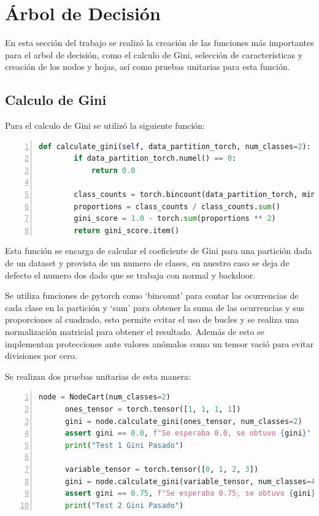 \documentclass[12pt,a4paper]{article}
\begin{document}
\section{Árbol de Decisión}\label{sec:arbol-de-decision}

En esta sección del trabajo se realizó la creación de las funciones más importantes para el arbol de decisión, como el calculo de Gini,
selección de características y creación de los nodos y hojas, así como pruebas unitarias para esta función.

\subsection{Calculo de Gini}\label{subsec:calculo-de-gini}

Para el calculo de Gini se utilizó la siguiente función:

    \begin{lstlisting}[language=Python, numbers=left,label={lst:lstlisting}, basicstyle=\ttfamily\tiny]
      def calculate_gini(self, data_partition_torch, num_classes=2):
        if data_partition_torch.numel() == 0:
            return 0.0

        class_counts = torch.bincount(data_partition_torch, minlength=num_classes).float()
        proportions = class_counts / class_counts.sum()
        gini_score = 1.0 - torch.sum(proportions ** 2)
        return gini_score.item()
    \end{lstlisting}

Esta función se encarga de calcular el coeficiente de Gini para una partición dada de un dataset y provista de un
numero de clases, en nuestro caso se deja de defecto el numero dos dado que se trabaja con normal y backdoor.

Se utiliza funciones de pytorch como `bincount' para contar las ocurrencias de cada clase en la partición y `sum' para obtener la suma de las ocurrencias
y sus proporciones al cuadrado, esto permite evitar el uso de bucles y se realiza una normalización matricial para obtener el resultado.
Además de esto se implementan protecciones ante valores anómalos como un tensor vació para evitar divisiones por cero.

Se realizan dos pruebas unitarias de esta manera:

    \begin{lstlisting}[language=Python, numbers=left,label={lst:lstlisting2}, basicstyle=\ttfamily\small]
      node = NodeCart(num_classes=2)
      ones_tensor = torch.tensor([1, 1, 1, 1])
      gini = node.calculate_gini(ones_tensor, num_classes=2)
      assert gini == 0.0, f"Se esperaba 0.0, se obtuvo {gini}"
      print("Test 1 Gini Pasado")

      variable_tensor = torch.tensor([0, 1, 2, 3])
      gini = node.calculate_gini(variable_tensor, num_classes=4)
      assert gini == 0.75, f"Se esperaba 0.75, se obtuvo {gini}"
      print("Test 2 Gini Pasado")
    \end{lstlisting}
\end{document}
